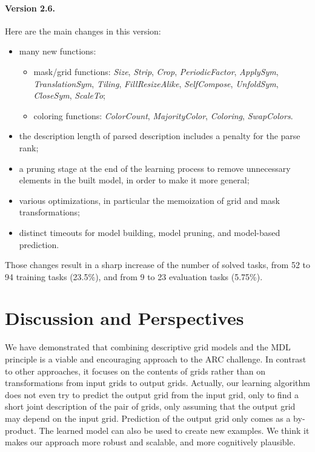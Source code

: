 \documentclass[a4paper]{llncs}
\begin{document}
\paragraph{Version 2.6.} Here are the main changes in this version:
\begin{itemize}
\item many new functions:
  \begin{itemize}
  \item mask/grid functions: {\it Size}, {\it Strip}, {\it Crop}, {\it PeriodicFactor}, {\it ApplySym}, {\it TranslationSym}, {\it Tiling}, {\it FillResizeAlike}, {\it SelfCompose}, {\it UnfoldSym}, {\it CloseSym}, {\it ScaleTo};
  \item coloring functions: {\it ColorCount}, {\it MajorityColor}, {\it Coloring}, {\it SwapColors}.
  \end{itemize}
\item the description length of parsed description includes a penalty for the parse rank;
\item a pruning stage at the end of the learning process to remove unnecessary elements in the built model, in order to make it more general;
\item various optimizations, in particular the memoization of grid and mask transformations;
\item distinct timeouts for model building, model pruning, and model-based prediction.
\end{itemize}
Those changes result in a sharp increase of the number of solved
tasks, from 52 to 94 training tasks (23.5\%), and from 9 to 23 evaluation tasks (5.75\%).

\section{Discussion and Perspectives}
\label{conclu}


We have demonstrated that combining descriptive grid models and the
MDL principle is a viable and encouraging approach to the ARC
challenge. In contrast to other approaches, it focuses on the contents
of grids rather than on transformations from input grids to output
grids. Actually, our learning algorithm does not even try to predict
the output grid from the input grid, only to find a short joint
description of the pair of grids, only assuming that the output grid
may depend on the input grid. Prediction of the output grid only comes
as a by-product. The learned model can also be used to create new
examples. We think it makes our approach more robust and scalable, and
more cognitively plausible.
\end{document}
